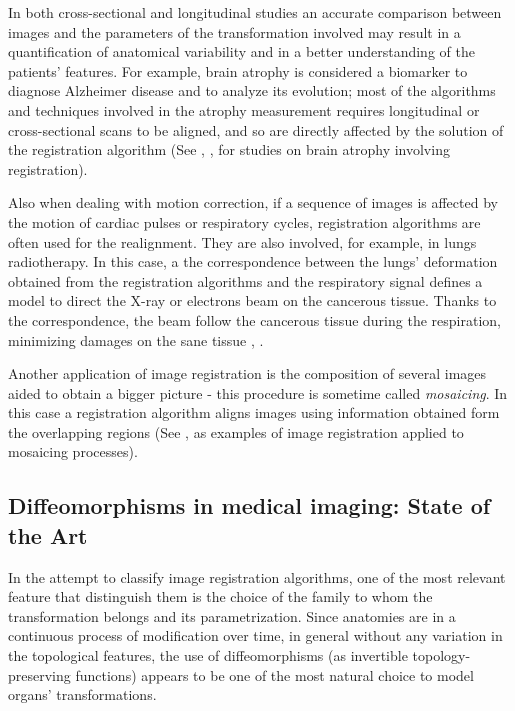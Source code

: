 In both cross-sectional and longitudinal studies an accurate comparison between images and the parameters of the transformation involved may result in a quantification of anatomical variability and in a better understanding of the patients' features. 
%
For example, brain atrophy is considered a biomarker to diagnose Alzheimer disease and to analyze its evolution; most of the algorithms and techniques involved in the atrophy measurement requires longitudinal or cross-sectional scans to be aligned, and so are directly affected by the solution of the registration algorithm (See \cite{prados2015measuring} \cite{fox1997brain}, \cite{gauthier2012prevention}, for studies on brain atrophy involving registration). 

Also when dealing with motion correction, if a sequence of images is affected by the motion of cardiac pulses or respiratory cycles, registration algorithms are often used for the realignment. 
They are also involved, for example, in lungs radiotherapy. In this case, a the correspondence between the lungs' deformation obtained from the registration algorithms and the respiratory signal defines a model to direct the X-ray or electrons beam on the cancerous tissue. Thanks to the correspondence, the beam follow the cancerous tissue during the respiration, minimizing damages on the sane tissue \cite{mcclelland}, \cite{mcclelland2011inter}.

Another application of image registration is the composition of several images aided to obtain a bigger picture - this procedure is sometime called \emph{mosaicing}. In this case a registration algorithm aligns images using information obtained form the overlapping regions (See \cite{vercauteren2006robust}, \cite{szeliski1994image} as examples of image registration applied to mosaicing processes).

\subsection{Diffeomorphisms in medical imaging: State of the Art}

In the attempt to classify image registration algorithms, one of the most relevant feature that distinguish them is the choice of the family to whom the transformation belongs and its parametrization. Since anatomies are in a continuous process of modification over time, in general without any variation in the topological features, the use of diffeomorphisms (as invertible topology-preserving functions) appears to be one of the most natural choice to model organs' transformations.

